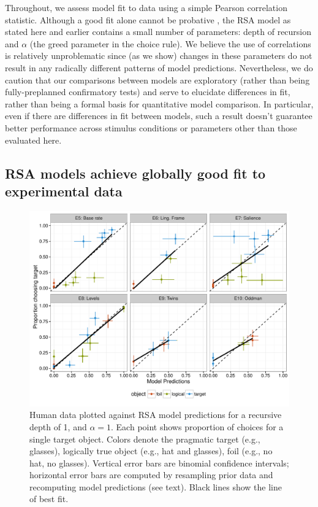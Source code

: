\documentclass[man,noapacite]{apa2}
\begin{document}
Throughout, we assess model fit to data using a simple Pearson correlation statistic. Although a good fit alone cannot be probative \cite{roberts2000}, the RSA model as stated here and earlier contains a small number of parameters: depth of recursion and $\alpha$ (the greed parameter in the choice rule). We believe the use of correlations is relatively unproblematic since (as we show) changes in these parameters do not result in any radically different patterns of model predictions. Nevertheless, we do caution that our comparisons between models are exploratory (rather than being fully-preplanned confirmatory tests) and serve to elucidate differences in fit, rather than being a formal basis for quantitative model comparison. In particular, even if there are differences in fit between models, such a result doesn't guarantee better performance across stimulus conditions or parameters other than those evaluated here.

\subsection{RSA models achieve globally good fit to experimental data}

\begin{figure}[t]
 \centering
 \includegraphics[width=6in]{../plots/model_basic.pdf}
 \caption{\label{fig:basic} Human data plotted against RSA model predictions for a recursive depth of 1, and $\alpha=1$. Each point shows proportion of choices for a single target object. Colors denote the pragmatic target (e.g., glasses), logically true object (e.g., hat and glasses), foil (e.g., no hat, no glasses). Vertical error bars are binomial confidence intervals; horizontal error bars are computed by resampling prior data and recomputing model predictions (see text). Black lines show the line of best fit.}
\end{figure}
\end{document}

